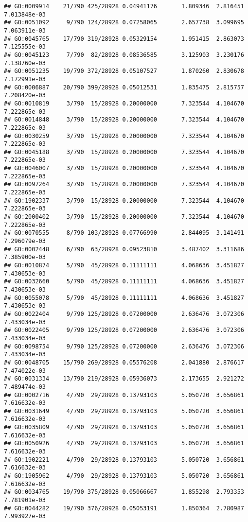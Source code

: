 \documentclass[
]{article}
\begin{document}
\begin{verbatim}
## GO:0009914    21/790 425/28928 0.04941176       1.809346  2.816451 7.013848e-03
## GO:0051092     9/790 124/28928 0.07258065       2.657738  3.099695 7.063911e-03
## GO:0045765    17/790 319/28928 0.05329154       1.951415  2.863073 7.125555e-03
## GO:0045123     7/790  82/28928 0.08536585       3.125903  3.230176 7.138760e-03
## GO:0051235    19/790 372/28928 0.05107527       1.870260  2.830678 7.172991e-03
## GO:0006887    20/790 399/28928 0.05012531       1.835475  2.815757 7.208420e-03
## GO:0010819     3/790  15/28928 0.20000000       7.323544  4.104670 7.222865e-03
## GO:0014848     3/790  15/28928 0.20000000       7.323544  4.104670 7.222865e-03
## GO:0030259     3/790  15/28928 0.20000000       7.323544  4.104670 7.222865e-03
## GO:0045188     3/790  15/28928 0.20000000       7.323544  4.104670 7.222865e-03
## GO:0046007     3/790  15/28928 0.20000000       7.323544  4.104670 7.222865e-03
## GO:0097264     3/790  15/28928 0.20000000       7.323544  4.104670 7.222865e-03
## GO:1902337     3/790  15/28928 0.20000000       7.323544  4.104670 7.222865e-03
## GO:2000402     3/790  15/28928 0.20000000       7.323544  4.104670 7.222865e-03
## GO:0070555     8/790 103/28928 0.07766990       2.844095  3.141491 7.296079e-03
## GO:0002448     6/790  63/28928 0.09523810       3.487402  3.311686 7.385900e-03
## GO:0010874     5/790  45/28928 0.11111111       4.068636  3.451827 7.430653e-03
## GO:0032660     5/790  45/28928 0.11111111       4.068636  3.451827 7.430653e-03
## GO:0055078     5/790  45/28928 0.11111111       4.068636  3.451827 7.430653e-03
## GO:0022404     9/790 125/28928 0.07200000       2.636476  3.072306 7.433034e-03
## GO:0022405     9/790 125/28928 0.07200000       2.636476  3.072306 7.433034e-03
## GO:0098754     9/790 125/28928 0.07200000       2.636476  3.072306 7.433034e-03
## GO:0048705    15/790 269/28928 0.05576208       2.041880  2.876617 7.474022e-03
## GO:0031334    13/790 219/28928 0.05936073       2.173655  2.921272 7.489474e-03
## GO:0002716     4/790  29/28928 0.13793103       5.050720  3.656861 7.616632e-03
## GO:0031649     4/790  29/28928 0.13793103       5.050720  3.656861 7.616632e-03
## GO:0035809     4/790  29/28928 0.13793103       5.050720  3.656861 7.616632e-03
## GO:0050926     4/790  29/28928 0.13793103       5.050720  3.656861 7.616632e-03
## GO:1902221     4/790  29/28928 0.13793103       5.050720  3.656861 7.616632e-03
## GO:1905962     4/790  29/28928 0.13793103       5.050720  3.656861 7.616632e-03
## GO:0034765    19/790 375/28928 0.05066667       1.855298  2.793353 7.781901e-03
## GO:0044282    19/790 376/28928 0.05053191       1.850364  2.780987 7.993927e-03

\end{verbatim}
\end{document}
